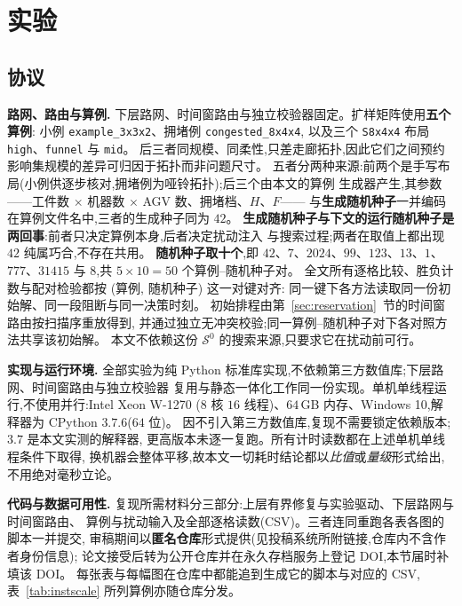 \documentclass[manuscript,screen,review]{acmart}
\newcommand{\NInst}{5}
\newcommand{\NSeeds}{10}
\newcommand{\NPairs}{50}
\begin{document}
\section{实验}
\label{sec:experiments}

\subsection{协议}
\label{sec:protocol}

\textbf{路网、路由与算例.}
下层路网、时间窗路由与独立校验器固定。扩样矩阵使用\textbf{五个算例}:
小例 \texttt{example\_3x3x2}、拥堵例 \texttt{congested\_8x4x4},
以及三个 \texttt{S8x4x4} 布局 \texttt{high}、\texttt{funnel} 与 \texttt{mid}。
后三者同规模、同柔性,只差走廊拓扑,因此它们之间预约影响集规模的差异可归因于拓扑而非问题尺寸。
五者分两种来源:前两个是手写布局(小例供逐步核对,拥堵例为哑铃拓扑);后三个由本文的算例
生成器产生,其参数——工件数 \(\times\) 机器数 \(\times\) AGV 数、拥堵档、\(H\)、\(F\)——
与\textbf{生成随机种子}一并编码在算例文件名中,三者的生成种子同为 \(42\)。
\textbf{生成随机种子与下文的运行随机种子是两回事}:前者只决定算例本身,后者决定扰动注入
与搜索过程;两者在取值上都出现 \(42\) 纯属巧合,不存在共用。
\textbf{随机种子取十个},即 \(42\)、\(7\)、\(2024\)、\(99\)、\(123\)、\(13\)、\(1\)、
\(777\)、\(31415\) 与 \(8\),共 \(\NInst\times\NSeeds=\NPairs\) 个算例--随机种子对。
全文所有逐格比较、胜负计数与配对检验都按 (算例, 随机种子) 这一对键对齐:
同一键下各方法读取同一份初始解、同一段阻断与同一决策时刻。
初始排程由第~\ref{sec:reservation}~节的时间窗路由按扫描序重放得到,
并通过独立无冲突校验;同一算例--随机种子对下各对照方法共享该初始解。
本文不依赖这份 \(\mathcal{S}^0\) 的搜索来源,只要求它在扰动前可行。

\textbf{实现与运行环境.}
全部实验为纯 Python 标准库实现,不依赖第三方数值库;下层路网、时间窗路由与独立校验器
复用与静态一体化工作同一份实现。单机单线程运行,不使用并行:Intel Xeon W-1270
(\(8\) 核 \(16\) 线程)、\(64\)\,GB 内存、Windows 10,解释器为 CPython \(3.7.6\)(\(64\) 位)。
因不引入第三方数值库,复现不需要锁定依赖版本;\(3.7\) 是本文实测的解释器,
更高版本未逐一复跑。所有计时读数都在上述单机单线程条件下取得,
换机器会整体平移,故本文一切耗时结论都以\emph{比值}或\emph{量级}形式给出,不用绝对毫秒立论。

\textbf{代码与数据可用性.}
复现所需材料分三部分:上层有界修复与实验驱动、下层路网与时间窗路由、
算例与扰动输入及全部逐格读数(CSV)。三者连同重跑各表各图的脚本一并提交,
审稿期间以\textbf{匿名仓库}形式提供(见投稿系统所附链接,仓库内不含作者身份信息);
论文接受后转为公开仓库并在永久存档服务上登记 DOI,本节届时补填该 DOI。
每张表与每幅图在仓库中都能追到生成它的脚本与对应的 CSV,
表~\ref{tab:instscale} 所列算例亦随仓库分发。
\end{document}
